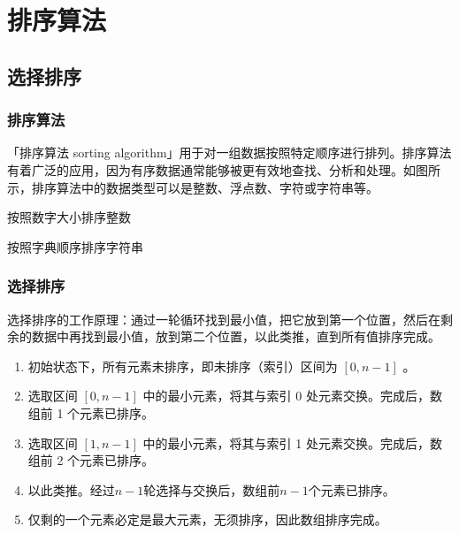 \section{排序算法}

\subsection{选择排序}
\begin{frame}
    \frametitle{排序算法}
    「排序算法 sorting algorithm」用于对一组数据按照特定顺序进行排列。排序算法有着广泛的应用，因为有序数据通常能够被更有效地查找、分析和处理。如图所示，排序算法中的数据类型可以是整数、浮点数、字符或字符串等。
    
    \begin{center}
        按照数字大小排序整数

        \medskip

        按照字典顺序排序字符串
        
        \medskip
    \end{center}
    
\end{frame}


\begin{frame}
    \frametitle{选择排序}
    选择排序的工作原理：通过一轮循环找到最小值，把它放到第一个位置，然后在剩余的数据中再找到最小值，放到第二个位置，以此类推，直到所有值排序完成。
    \begin{enumerate}
      \item 初始状态下，所有元素未排序，即未排序（索引）区间为 $[0, n-1]$ 。
      \item 选取区间 $[0, n-1]$ 中的最小元素，将其与索引 0 处元素交换。完成后，数组前 1 个元素已排序。
      \item 选取区间 $[1, n-1]$ 中的最小元素，将其与索引 1 处元素交换。完成后，数组前 2 个元素已排序。
      \item 以此类推。经过$n-1$轮选择与交换后，数组前$n-1$个元素已排序。
      \item 仅剩的一个元素必定是最大元素，无须排序，因此数组排序完成。
    \end{enumerate}
\end{frame}


